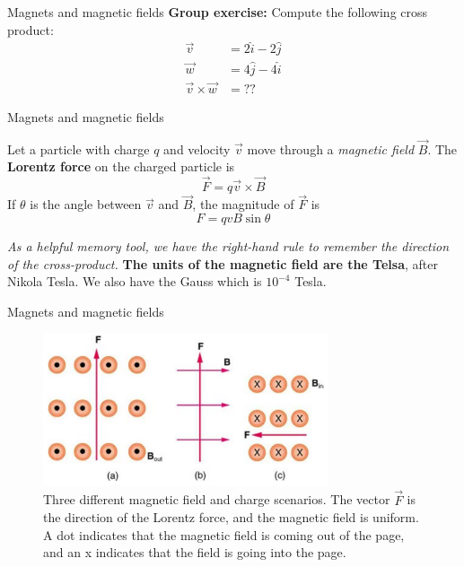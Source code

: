 \documentclass{beamer}
\begin{document}
\begin{frame}{Magnets and magnetic fields}
\textbf{Group exercise:} Compute the following cross product:
\begin{align}
\vec{v} &= 2\hat{i}-2\hat{j} \\
\vec{w} &= 4\hat{j}-4\hat{i} \\
\vec{v} \times \vec{w} &= ??
\end{align}
\end{frame}

\begin{frame}{Magnets and magnetic fields}
\small
\begin{tcolorbox}[colback=white,colframe=black!100!black,title=The Lorentz Force]
\alert{Let a particle with charge $q$ and velocity $\vec{v}$ move through a \textit{magnetic field} $\vec{B}$.  The \textbf{Lorentz force} on the charged particle is
\begin{equation}
\vec{F} = q\vec{v} \times \vec{B}
\label{eq:Lorentz}
\end{equation}
If $\theta$ is the angle between $\vec{v}$ and $\vec{B}$, the magnitude of $\vec{F}$ is
\begin{equation}
F = qvB \sin\theta
\end{equation}}
\footnotesize
\end{tcolorbox}
\textit{As a helpful memory tool, we have the right-hand rule to remember the direction of the cross-product.}  \textbf{The units of the magnetic field are the Telsa}, after Nikola Tesla.  We also have the Gauss which is $10^{-4}$ Tesla.
\end{frame}

\begin{frame}{Magnets and magnetic fields}
\begin{figure}
\centering
\includegraphics[width=0.75\textwidth]{figures/lorentzProblem.png}
\caption{\label{fig:lorentzProblem} Three different magnetic field and charge scenarios.  The vector $\vec{F}$ is the direction of the Lorentz force, and the magnetic field is uniform.  A dot indicates that the magnetic field is coming out of the page, and an x indicates that the field is going into the page.}
\end{figure}
\end{frame}
\end{document}
